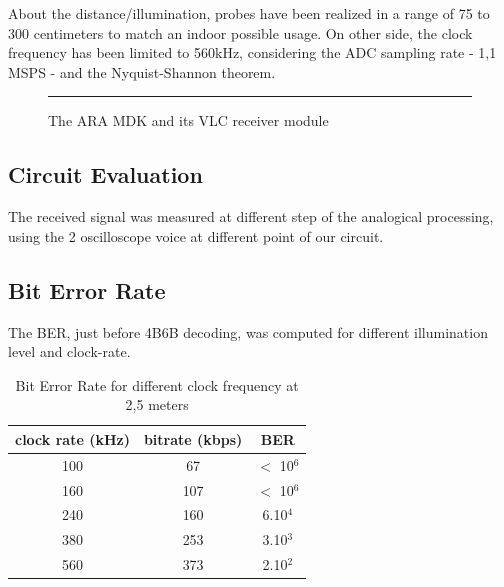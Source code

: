 About the distance/illumination, probes have been realized in a range of 75 to 300 centimeters to match an indoor possible usage. On other side, the clock frequency has been limited to 560kHz, considering the ADC sampling rate - 1,1 MSPS - and the Nyquist-Shannon theorem.
\begin{figure}[htbp]
  \centering
    \rule{35em}{0.5pt}
  \caption[The ARA MDK and its VLC receiver module]{The ARA MDK and its VLC receiver module}
  \label{fig:receiver}
\end{figure}

\subsection{Circuit Evaluation}

The received signal was measured at different step of the analogical processing, using the 2 oscilloscope voice at different point of our circuit.



\subsection{Bit Error Rate}

The BER, just before 4B6B decoding, was computed for different illumination level and clock-rate.

\begin{table}[htbp]
\begin{center}
\begin{tabular}{|c|c|c|}
  \hline
  clock rate (kHz) & bitrate (kbps) & BER \\
  \hline
  100 & 67 & $<$ 10$^6$ \\
  160 & 107 & $<$ 10$^6$ \\
  240 & 160 & 6.10$^4$ \\
  380 & 253 & 3.10$^3$ \\
  560 & 373 & 2.10$^2$ \\
  \hline
\end{tabular}
\end{center}
\caption{Bit Error Rate for different clock frequency at 2,5 meters}
\label{tab:ber}
\end{table}

